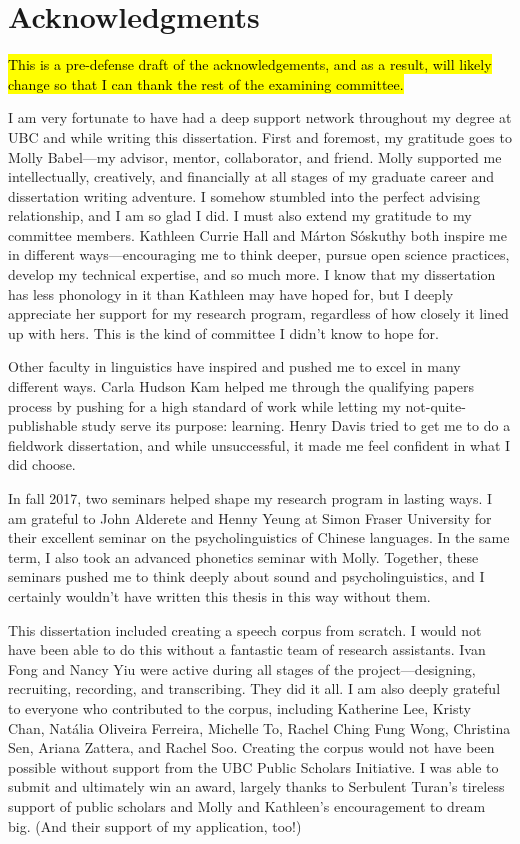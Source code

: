 
\chapter{Acknowledgments}

\hl{This is a pre-defense draft of the acknowledgements, and as a result, will likely change so that I can thank the rest of the examining committee. }

I am very fortunate to have had a deep support network throughout my degree at UBC and while writing this dissertation. First and foremost, my gratitude goes to Molly Babel---my advisor, mentor, collaborator, and friend. Molly supported me intellectually, creatively, and financially at all stages of my graduate career and dissertation writing adventure. I somehow stumbled into the perfect advising relationship, and I am so glad I did. I must also extend my gratitude to my committee members. Kathleen Currie Hall and Márton Sóskuthy both inspire me in different ways---encouraging me to think deeper, pursue open science practices, develop my technical expertise, and so much more. I know that my dissertation has less phonology in it than Kathleen may have hoped for, but I deeply appreciate her support for my research program, regardless of how closely it lined up with hers. This is the kind of committee I didn't know to hope for. 

Other faculty in linguistics have inspired and pushed me to excel in many different ways. Carla Hudson Kam helped me through the qualifying papers process by pushing for a high standard of work while letting my not-quite-publishable study serve its purpose: learning. Henry Davis tried to get me to do a fieldwork dissertation, and while unsuccessful, it made me feel confident in what I did choose. 

In fall 2017, two seminars helped shape my research program in lasting ways. I am grateful to John Alderete and Henny Yeung at Simon Fraser University for their excellent seminar on the psycholinguistics of Chinese languages. In the same term, I also took an advanced phonetics seminar with Molly. Together, these seminars pushed me to think deeply about sound and psycholinguistics, and I certainly wouldn't have written this thesis in this way without them.

This dissertation included creating a speech corpus from scratch. I would not have been able to do this without a fantastic team of research assistants. Ivan Fong and Nancy Yiu were active during all stages of the project---designing, recruiting, recording, and transcribing. They did it all. I am also deeply grateful to everyone who contributed to the corpus, including Katherine Lee, Kristy Chan, Natália Oliveira Ferreira, Michelle To, Rachel Ching Fung Wong, Christina Sen, Ariana Zattera, and Rachel Soo. Creating the corpus would not have been possible without support from the UBC Public Scholars Initiative. I was able to submit and ultimately win an award, largely thanks to Serbulent Turan's tireless support of public scholars and Molly and Kathleen's encouragement to dream big. (And their support of my application, too!)


